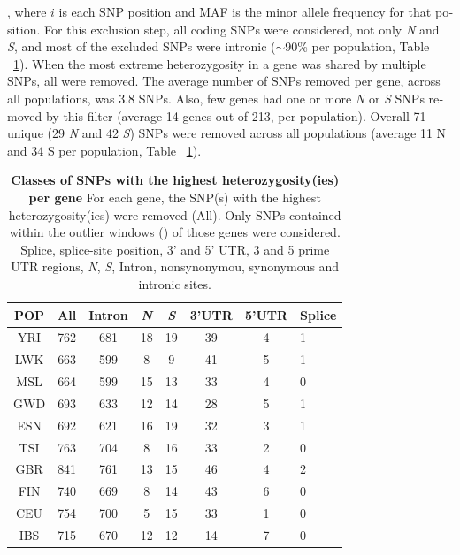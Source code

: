 \begin{refsection}
\begin{otherlanguage}{english}
, where $i$ is each SNP position and MAF is the minor allele frequency for that position. For this exclusion step, all coding SNPs were considered, not only \emph{N} and \emph{S}, and most of the excluded SNPs were intronic ($\sim 90$\% per population, Table ~\ref{tab:Hremove}). When the most extreme heterozygosity in a gene was shared by multiple SNPs, all were removed. The average number of SNPs removed per gene, across all populations, was 3.8 SNPs. Also, few genes had one or more \emph{N} or \emph{S} SNPs removed by this filter (average 14 genes out of 213, per population). Overall 71 unique (29 \emph{N} and 42 \emph{S}) SNPs were removed across all populations (average 11 N and 34 S per population, Table ~\ref{tab:Hremove}). 



\begin{table}[ht]
\centering
\small
\begin{tabular}{@{}cccccccl@{}}
\toprule
\rowcolor[HTML]{C0C0C0} 
POP & All & Intron & \emph{N} & \emph{S} & 3'UTR & 5'UTR & Splice \\ \midrule
YRI & 762 & 681 & 18 & 19 & 39 & 4 & 1 \\
LWK & 663 & 599 & 8 & 9 & 41 & 5 & 1 \\
MSL & 664 & 599 & 15 & 13 & 33 & 4 & 0 \\
GWD & 693 & 633 & 12 & 14 & 28 & 5 & 1 \\
ESN & 692 & 621 & 16 & 19 & 32 & 3 & 1 \\
TSI & 763 & 704 & 8 & 16 & 33 & 2 & 0 \\
GBR & 841 & 761 & 13 & 15 & 46 & 4 & 2 \\
FIN & 740 & 669 & 8 & 14 & 43 & 6 & 0 \\
CEU & 754 & 700 & 5 & 15 & 33 & 1 & 0 \\
IBS & 715 & 670 & 12 & 12 & 14 & 7 & 0 \\ \bottomrule
\end{tabular}
\caption{\textbf{Classes of SNPs with the highest heterozygosity(ies) per gene} For each gene, the SNP(s) with the highest heterozygosity(ies) were removed (All). Only SNPs contained within the outlier windows (\cite{Bitarello2016}) of those genes were considered. Splice, splice-site position, 3' and 5' UTR, 3 and 5 prime UTR regions, \emph{N}, \emph{S}, Intron, nonsynonymou, synonymous and intronic sites.
}
\label{tab:Hremove}
\end{table}


\end{otherlanguage}
\end{refsection}
